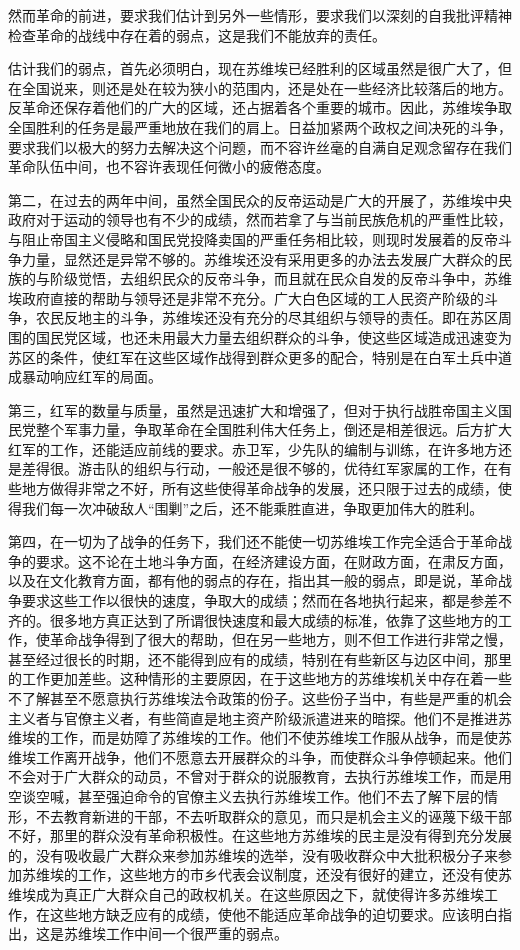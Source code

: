 然而革命的前进，要求我们估计到另外一些情形，要求我们以深刻的自我批评精神检查革命的战线中存在着的弱点，这是我们不能放弃的责任。

估计我们的弱点，首先必须明白，现在苏维埃已经胜利的区域虽然是很广大了，但在全国说来，则还是处在较为狭小的范围内，还是处在一些经济比较落后的地方。反革命还保存着他们的广大的区域，还占据着各个重要的城市。因此，苏维埃争取全国胜利的任务是最严重地放在我们的肩上。日益加紧两个政权之间决死的斗争，要求我们以极大的努力去解决这个问题，而不容许丝毫的自满自足观念留存在我们革命队伍中间，也不容许表现任何微小的疲倦态度。

第二，在过去的两年中间，虽然全国民众的反帝运动是广大的开展了，苏维埃中央政府对于运动的领导也有不少的成绩，然而若拿了与当前民族危机的严重性比较，与阻止帝国主义侵略和国民党投降卖国的严重任务相比较，则现时发展着的反帝斗争力量，显然还是异常不够的。苏维埃还没有采用更多的办法去发展广大群众的民族的与阶级觉悟，去组织民众的反帝斗争，而且就在民众自发的反帝斗争中，苏维埃政府直接的帮助与领导还是非常不充分。广大白色区域的工人民资产阶级的斗争，农民反地主的斗争，苏维埃还没有充分的尽其组织与领导的责任。即在苏区周围的国民党区域，也还未用最大力量去组织群众的斗争，使这些区域造成迅速变为苏区的条件，使红军在这些区域作战得到群众更多的配合，特别是在白军土兵中道成暴动响应红军的局面。

第三，红军的数量与质量，虽然是迅速扩大和增强了，但对于执行战胜帝国主义国民党整个军事力量，争取革命在全国胜利伟大任务上，倒还是相差很远。后方扩大红军的工作，还能适应前线的要求。赤卫军，少先队的编制与训练，在许多地方还是差得很。游击队的组织与行动，一般还是很不够的，优待红军家属的工作，在有些地方做得非常之不好，所有这些使得革命战争的发展，还只限于过去的成绩，使得我们每一次冲破敌人“围剿”之后，还不能乘胜直进，争取更加伟大的胜利。

第四，在一切为了战争的任务下，我们还不能使一切苏维埃工作完全适合于革命战争的要求。这不论在土地斗争方面，在经济建设方面，在财政方面，在肃反方面，以及在文化教育方面，都有他的弱点的存在，指出其一般的弱点，即是说，革命战争要求这些工作以很快的速度，争取大的成绩；然而在各地执行起来，都是参差不齐的。很多地方真正达到了所谓很快速度和最大成绩的标准，依靠了这些地方的工作，使革命战争得到了很大的帮助，但在另一些地方，则不但工作进行非常之慢，甚至经过很长的时期，还不能得到应有的成绩，特别在有些新区与边区中间，那里的工作更加差些。这种情形的主要原因，在于这些地方的苏维埃机关中存在着一些不了解甚至不愿意执行苏维埃法令政策的份子。这些份子当中，有些是严重的机会主义者与官僚主义者，有些简直是地主资产阶级派遣进来的暗探。他们不是推进苏维埃的工作，而是妨障了苏维埃的工作。他们不使苏维埃工作服从战争，而是使苏维埃工作离开战争，他们不愿意去开展群众的斗争，而使群众斗争停顿起来。他们不会对于广大群众的动员，不曾对于群众的说服教育，去执行苏维埃工作，而是用空谈空喊，甚至强迫命令的官僚主义去执行苏维埃工作。他们不去了解下层的情形，不去教育新进的干部，不去听取群众的意见，而只是机会主义的诬蔑下级干部不好，那里的群众没有革命积极性。在这些地方苏维埃的民主是没有得到充分发展的，没有吸收最广大群众来参加苏维埃的选举，没有吸收群众中大批积极分子来参加苏维埃的工作，这些地方的市乡代表会议制度，还没有很好的建立，还没有使苏维埃成为真正广大群众自己的政权机关。在这些原因之下，就使得许多苏维埃工作，在这些地方缺乏应有的成绩，使他不能适应革命战争的迫切要求。应该明白指出，这是苏维埃工作中间一个很严重的弱点。

